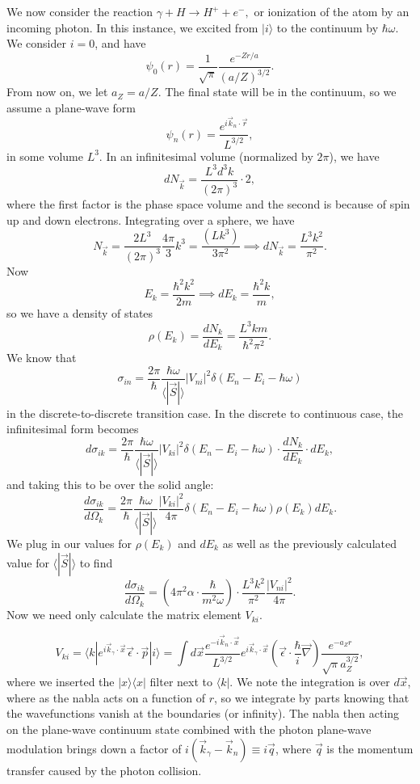 \documentclass[fontsize=12pt]{scrartcl}
\newcommand{\la}{\langle}
\newcommand{\ra}{\rangle}
\begin{document}
We now consider the reaction $\gamma+H\to H^++e^-,$ or ionization of the atom by an incoming photon. In this instance, we excited from $|i\ra$ to the continuum by $\hbar\omega$. We consider $i=0$, and have $$\psi_0(r)=\frac{1}{\sqrt{\pi}}\frac{e^{-Zr/a}}{(a/Z)^{3/2}}.$$ From now on, we let $a_Z=a/Z$. The final state will be in the continuum, so we assume a plane-wave form $$\psi_n(r)=\frac{e^{i\vec{k}_n\cdot\vec{r}}}{L^{3/2}},$$ in some volume $L^3$. In an infinitesimal volume (normalized by $2\pi$), we have $$dN_{\vec{k}}=\frac{L^3d^3k}{(2\pi)^3}\cdot 2,$$ where the first factor is the phase space volume and the second is because of spin up and down electrons. Integrating over a sphere, we have $$N_{\vec{k}}=\frac{2L^3}{(2\pi)^3}\frac{4\pi}{3}k^3 = \frac{(Lk^3)}{3\pi^2}\implies dN_{\vec{k}}=\frac{L^3k^2}{\pi^2}.$$ Now $$E_k=\frac{\hbar^2k^2}{2m}\implies dE_k = \frac{\hbar^2k}{m},$$ so we have a density of states $$\rho(E_k)=\frac{dN_k}{dE_k}=\frac{L^3km}{\hbar^2\pi^2}.$$ We know that $$\sigma_{in} = \frac{2\pi}{\hbar}\frac{\hbar\omega}{\la |\vec{S}|\ra}|V_{ni}|^2\delta(E_n-E_i-\hbar\omega)$$ in the discrete-to-discrete transition case. In the discrete to continuous case, the infinitesimal form becomes $$d\sigma_{ik}=\frac{2\pi}{\hbar}\frac{\hbar\omega}{\la|\vec{S}|\ra}|V_{ki}|^2\delta(E_n-E_i-\hbar\omega)\cdot\frac{dN_k}{dE_k}\cdot dE_k,$$ and taking this to be over the solid angle: $$\frac{d\sigma_{ik}}{d\Omega_k}=\frac{2\pi}{\hbar}\frac{\hbar\omega}{\la|\vec{S}|\ra} \frac{|V_{ki}|^2}{4\pi}\delta(E_n-E_i-\hbar\omega)\rho(E_k)dE_k.$$ We plug in our values for $\rho(E_k)$ and $dE_k$ as well as the previously calculated value for $\la|\vec{S}|\ra$ to find $$\frac{d\sigma_{ik}}{d\Omega_k}=\left(4\pi^2\alpha\cdot\frac{\hbar}{m^2\omega}\right)\cdot\frac{L^3k^2}{\pi^2}\frac{|V_{ni}|^2}{4\pi}.$$ Now we need only calculate the matrix element $V_{ki}$.

$$V_{ki}=\la k|e^{i\vec{k}_\gamma\cdot\vec{x}} \vec{\epsilon}\cdot\vec{p}|i\ra = \int d\vec{x} \frac{e^{-i\vec{k}_n\cdot\vec{x}}}{L^{3/2}}e^{i\vec{k}_\gamma\cdot\vec{x}}\left(\vec{\epsilon}\cdot\frac{\hbar}{i}\vec{\nabla}\right)\frac{e^{-a_Zr}}{\sqrt{\pi}a_Z^{3/2}},$$ where we inserted the $|x\ra\la x|$ filter next to $\la k |$. We note the integration is over $d\vec{x}$, where as the nabla acts on a function of $r$, so we integrate by parts knowing that the wavefunctions vanish at the boundaries (or infinity). The nabla then acting on the plane-wave continuum state combined with the photon plane-wave modulation brings down a factor of $i(\vec{k}_\gamma-\vec{k}_n)\equiv i\vec{q}$, where $\vec{q}$ is the momentum transfer caused by the photon collision. 
\end{document}
